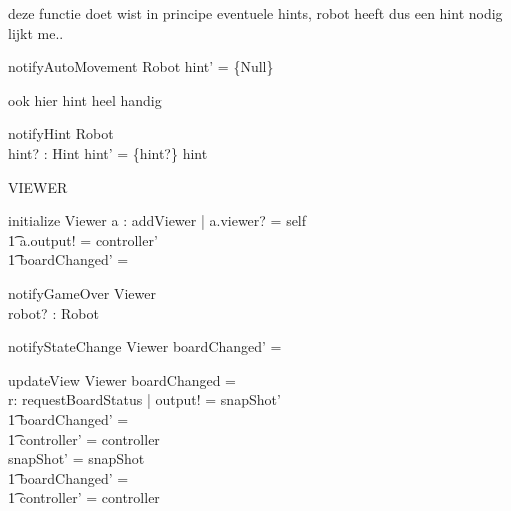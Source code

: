 \documentclass[a4paper,11pt]{article}
\begin{document}
deze functie doet wist in principe eventuele hints, robot heeft dus een hint nodig lijkt me..
\begin{schema}{notifyAutoMovement}
\Delta Robot
\where
hint' = \{Null\}
\end{schema}

ook hier hint heel handig
\begin{schema}{notifyHint}
\Delta Robot \\
hint? : Hint
\where
hint' = \{hint?\} \union hint
\end{schema}

VIEWER

\begin{schema}{initialize}
\Delta Viewer
\where
\exists a : addViewer | a.viewer? = self \implies \\ \t1
a.output! = controller' \\ \t1
boardChanged' = \false
\end{schema}

\begin{schema}{notifyGameOver}
\Delta Viewer \\
robot? : Robot
\where
\end{schema}

\begin{schema}{notifyStateChange}
\Delta Viewer 
\where
boardChanged' = \true
\end{schema}

\begin{schema}{updateView}
\Delta Viewer
\where
\IF boardChanged = \true \\
\THEN \exists r: requestBoardStatus | output! = snapShot' \\ \t1
boardChanged' = \false \\ \t1
controller' = controller \\ 
\ELSE snapShot' = snapShot \\ \t1
boardChanged' = \false \\ \t1
controller' = controller
\end{schema}
\end{document}
